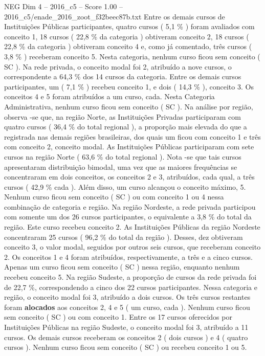 \begin{textsample}{NEG Dim 4 – 2016\_c5 – Score 1.00 – 2016\_c5/enade\_2016\_zoot\_f32beec87b.txt}
Entre os demais cursos de Instituições Públicas participantes, quatro cursos ( 5,1 \% ) foram avaliados com conceito 1, 18 cursos ( 22,8 \% da categoria ) obtiveram conceito 2, 18 cursos ( 22,8 \% da categoria ) obtiveram conceito 4 e, como já comentado, três cursos ( 3,8 \% ) receberam conceito 5.
Nesta categoria, nenhum curso ficou sem conceito ( SC ).
Na rede privada, o conceito modal foi 2, atribuído a nove cursos, o correspondente a 64,3 \% dos 14 cursos da categoria.
Entre os demais cursos participantes, um ( 7,1 \% ) recebeu conceito 1, e dois ( 14,3 \% ), conceito 3.
Os conceitos 4 e 5 foram atribuídos a um curso, cada.
Nesta Categoria Administrativa, nenhum curso ficou sem conceito ( SC ).
Na análise por região, observa -se que, na região Norte, as Instituições Privadas participaram com quatro cursos ( 36,4 \% do total regional ), a proporção mais elevada do que a registrada nas demais regiões brasileiras, dos quais um ficou com conceito 1 e três com conceito 2, conceito modal.
As Instituições Públicas participaram com sete cursos na região Norte ( 63,6 \% do total regional ).
Nota -se que tais cursos apresentaram distribuição bimodal, uma vez que as maiores frequências se concentraram em dois conceitos, os conceitos 2 e 3, atribuídos, cada qual, a três cursos ( 42,9 \% cada ).
Além disso, um curso alcançou o conceito máximo, 5.
Nenhum curso ficou sem conceito ( SC ) ou com conceito 1 ou 4 nessa combinação de categoria e região.
Na região Nordeste, a rede privada participou com somente um dos 26 cursos participantes, o equivalente a 3,8 \% do total da região.
Este curso recebeu conceito 2.
As Instituições Públicas da região Nordeste concentraram 25 cursos ( 96,2 \% do total da região ).
Desses, dez obtiveram conceito 3, o valor modal, seguidos por outros seis cursos, que receberam conceito 2.
Os conceitos 1 e 4 foram atribuídos, respectivamente, a três e a cinco cursos.
Apenas um curso ficou sem conceito ( SC ) nessa região, enquanto nenhum recebeu conceito 5.
Na região Sudeste, a proporção de cursos da rede privada foi de 22,7 \%, correspondendo a cinco dos 22 cursos participantes.
Nessa categoria e região, o conceito modal foi 3, atribuído a dois cursos.
Os três cursos restantes foram \textbf{alocados} aos conceitos 2, 4 e 5 ( um curso, cada ).
Nenhum curso ficou sem conceito ( SC ) ou com conceito 1.
Entre os 17 cursos oferecidos por Instituições Públicas na região Sudeste, o conceito modal foi 3, atribuído a 11 cursos.
Os demais cursos receberam os conceitos 2 ( dois cursos ) e 4 ( quatro cursos ).
Nenhum curso ficou sem conceito ( SC ) ou recebeu conceito 1 ou 5.

\end{textsample}
